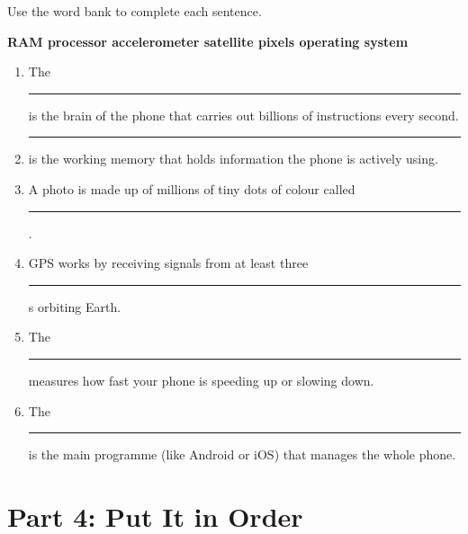 \begin{tcolorbox}[enhanced,colback=LeafGreen!8,colframe=LeafGreen,arc=6pt,boxrule=1pt,
  left=10pt,right=10pt,top=8pt,bottom=8pt]

Use the word bank to complete each sentence.

\begin{center}
\begin{tcolorbox}[colback=SunYellow!20,colframe=SunYellow!70!black,arc=4pt,boxrule=0.6pt,width=0.9\linewidth]
\centering\bfseries
RAM \quad processor \quad accelerometer \quad satellite \quad pixels \quad operating system
\end{tcolorbox}
\end{center}

\begin{enumerate}[label=\textbf{\arabic*.}]
  \item The \rule{3cm}{0.4pt} is the brain of the phone that carries out billions of instructions every second.
  \item \rule{3cm}{0.4pt} is the working memory that holds information the phone is actively using.
  \item A photo is made up of millions of tiny dots of colour called \rule{3cm}{0.4pt}.
  \item GPS works by receiving signals from at least three \rule{3cm}{0.4pt}s orbiting Earth.
  \item The \rule{3cm}{0.4pt} measures how fast your phone is speeding up or slowing down.
  \item The \rule{3cm}{0.4pt} is the main programme (like Android or iOS) that manages the whole phone.
\end{enumerate}
\end{tcolorbox}

\vspace{12pt}

\section*{Part 4: Put It in Order}

